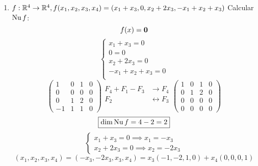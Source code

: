 \documentclass[../practica.root.tex]{subfiles}
\begin{document}
\begin{enumerate}
\begin{enumerate}
              \item $ f : \mathbb{R}^4 \to \mathbb{R}^4, f(x_1,x_2,x_3,x_4) = (x_1 + x_3, 0, x_2 + 2x_3, -x_1 + x_2 + x_3) $
                    Calcular $\operatorname{Nu} f$:
                    \[ f(x) = \mathbf{0} \]
                    \[
                        \begin{cases}
                            x_1 + x_3 = 0        \\
                            0 = 0                \\
                            x_2 + 2x_3 = 0       \\
                            -x_1 + x_2 + x_3 = 0 \\
                        \end{cases}
                    \] \[
                        \begin{pmatrix}
                            1  & 0 & 1 & 0 \\
                            0  & 0 & 0 & 0 \\
                            0  & 1 & 2 & 0 \\
                            -1 & 1 & 1 & 0
                        \end{pmatrix}
                        \begin{array}{rl}
                            F_4 + F_1 - F_3 & \to F_4             \\
                            F_2             & \leftrightarrow F_3 \\
                        \end{array}
                        \begin{pmatrix}
                            1 & 0 & 1 & 0 \\
                            0 & 1 & 2 & 0 \\
                            0 & 0 & 0 & 0 \\
                            0 & 0 & 0 & 0
                        \end{pmatrix}
                    \] \[
                        \boxed{\dim \operatorname{Nu} f = 4 - 2 = 2}
                    \] \[
                        \begin{cases}
                            x_1 + x_3 = 0 \implies x_1 = -x_3 \\
                            x_2 + 2x_3 = 0 \implies x_2 = -2x_3
                        \end{cases}
                    \] \[
                        (x_1, x_2, x_3, x_4) = (-x_3, -2x_3, x_3, x_4) = x_3(-1,-2,1,0) + x_4(0,0,0,1)
\]
\end{enumerate}
\end{enumerate}
\end{document}
